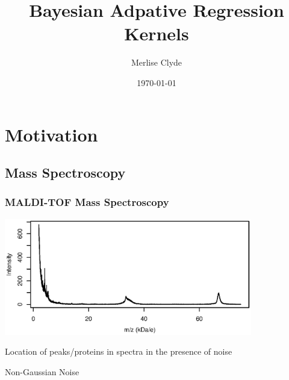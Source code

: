 \documentclass[]{beamer}
\title{Bayesian Adpative Regression Kernels}
\author[M. Clyde]{Merlise Clyde}
\institute{Department of Statistical Science \\ Duke
University }
\date{\today}
\newcommand{\bs}[2]{\begin{frame} \frametitle{#1}
{#2}
\end{frame} }
\begin{document}
\begin{frame}
  \titlepage
\end{frame}

\section{Motivation}

\subsection{Mass Spectroscopy}
\bs{MALDI-TOF Mass Spectroscopy} {
\centerline{  \includegraphics[height=2in]{mean-spectrum.ps}}

Location of peaks/proteins in spectra  in the presence of noise

Non-Gaussian  Noise
}
\end{document}
